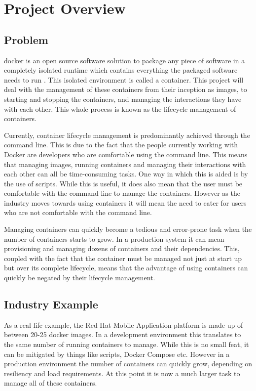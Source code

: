\section{Project Overview}
\subsection{Problem}
\label{sub:problem}

\gls{docker} is an \gls{open source} software solution to package any piece of software in a completely isolated runtime which contains everything the packaged software needs to run \citep{WhatDocker}. This isolated environment is called a \gls{container}. This project will deal with the management of these containers from their inception as images, to starting and stopping the containers, and managing the interactions they have with each other. This whole process is known as the \gls{lifecycle management} of containers.

Currently, container \gls{lifecycle management} is predominantly achieved through the \gls{command line}. This is due to the fact that the people currently working with Docker are developers who are comfortable using the command line. This means that managing images, running containers and managing their interactions with each other can all be time-consuming tasks. One way in which this is aided is by the use of scripts. While this is useful, it does also mean that the user must be comfortable with the command line to manage the containers. However as the industry moves towards using containers \citep{Datadog2016} it will mean the need to cater for users who are not comfortable with the command line.

Managing containers can quickly become a tedious and error-prone task when the number of containers starts to grow. In a production system it can mean provisioning and managing dozens of containers and their dependencies. This, coupled with the fact that the container must be managed not just at start up but over its complete lifecycle, means that the advantage of using containers can quickly be negated by their lifecycle management.

\subsection{Industry Example}
\label{sub:industry}
As a real-life example, the Red Hat Mobile Application platform \citep{RedHat2016} is made up of between 20-25 \gls{docker image}s. In a development environment this translates to the same number of running containers to manage. While this is no small feat, it can be mitigated by things like scripts, \gls{Docker Compose} etc. However in a production environment the number of containers can quickly grow, depending on resiliency and load requirements. At this point it is now a much larger task to manage all of these containers. 

